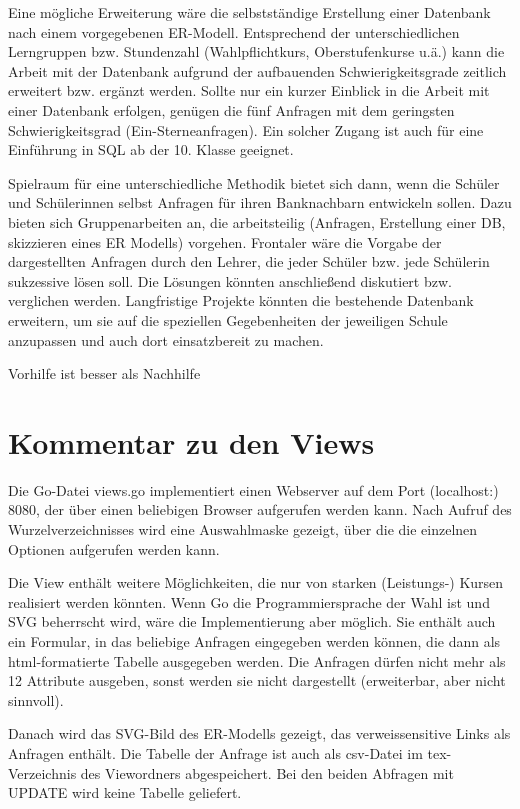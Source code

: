 \documentclass[fleqn]{scrartcl}
\begin{document}
Eine mögliche Erweiterung wäre die selbstständige Erstellung einer Datenbank nach einem vorgegebenen ER-Modell. Entsprechend der unterschiedlichen Lerngruppen bzw. Stundenzahl (Wahlpflichtkurs, Oberstufenkurse u.ä.) kann die Arbeit mit der Datenbank aufgrund der aufbauenden Schwierigkeitsgrade zeitlich erweitert bzw. ergänzt werden. Sollte nur ein kurzer Einblick in die Arbeit mit einer Datenbank erfolgen, genügen die fünf Anfragen mit dem geringsten Schwierigkeitsgrad (Ein-Sterneanfragen). Ein solcher Zugang ist auch für eine Einführung in SQL ab der 10. Klasse geeignet. 

Spielraum für eine unterschiedliche Methodik bietet sich dann, wenn die Schüler und Schülerinnen selbst Anfragen für ihren Banknachbarn entwickeln sollen. Dazu bieten sich Gruppenarbeiten an, die arbeitsteilig (Anfragen, Erstellung einer DB, skizzieren eines ER Modells) vorgehen. Frontaler wäre die Vorgabe der dargestellten Anfragen durch den Lehrer, die jeder Schüler bzw. jede Schülerin sukzessive lösen soll. Die Lösungen könnten anschließend diskutiert bzw. verglichen werden. Langfristige Projekte könnten die bestehende Datenbank erweitern, um sie auf die speziellen Gegebenheiten der jeweiligen Schule anzupassen und auch dort einsatzbereit zu machen. 

Vorhilfe ist besser als Nachhilfe
\section{Kommentar zu den Views}
Die Go-Datei views.go implementiert einen Webserver auf dem Port (localhost:) 8080, der über einen beliebigen Browser aufgerufen werden kann.
Nach Aufruf des Wurzelverzeichnisses wird eine Auswahlmaske gezeigt, über die die einzelnen Optionen aufgerufen werden kann.
 

Die View enthält weitere Möglichkeiten, die nur von starken (Leistungs-) Kursen realisiert werden könnten. Wenn Go
die Programmiersprache der Wahl ist und SVG beherrscht wird, wäre die Implementierung aber möglich. 
Sie enthält auch ein Formular, in das beliebige Anfragen eingegeben werden können, die dann als html-formatierte Tabelle ausgegeben werden.
Die Anfragen dürfen nicht mehr als 12 Attribute ausgeben, sonst werden sie nicht dargestellt (erweiterbar, aber nicht sinnvoll).

Danach wird das SVG-Bild des ER-Modells gezeigt, das verweissensitive Links als Anfragen enthält.
Die Tabelle der Anfrage ist auch als csv-Datei im tex-Verzeichnis des Viewordners abgespeichert. 
Bei den beiden Abfragen mit UPDATE wird keine Tabelle geliefert.
\end{document}
